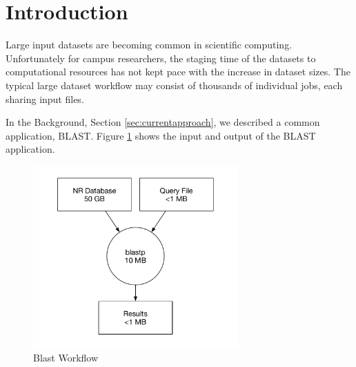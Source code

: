 \label{chapter:campusdatadistribution}






%




\section{Introduction}

Large input datasets are becoming common in scientific computing.  Unfortunately for campus researchers, the staging time of the datasets to computational resources has not kept pace with the increase in dataset sizes.  The typical large dataset workflow may consist of thousands of individual jobs, each sharing input files.

In the Background, Section \ref{sec:currentapproach}, we described a common application, BLAST.  Figure \ref{fig:blastworkflowdata} shows the input and output of the BLAST application.

\begin{figure}
	\centering
	\includegraphics[width=0.7\textwidth]{images/BlastWorkflow}
	\caption{Blast Workflow}
	\label{fig:blastworkflowdata}
\end{figure}

